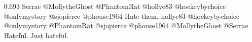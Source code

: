 {0.693}
{\joinNameTweet
{Serrae}
{@MollytheGhost @PhantomRat @hollye83 @hockeybychoice @onlymystory @sjopierce @phouse1964 Hate them.}}
{\joinNameTweet
{hollye83}
{@hockeybychoice @onlymystory @PhantomRat @sjopierce @phouse1964 @MollytheGhost @Serrae Hateful. Just hateful.}}
%
%
%
%
%
%
%
